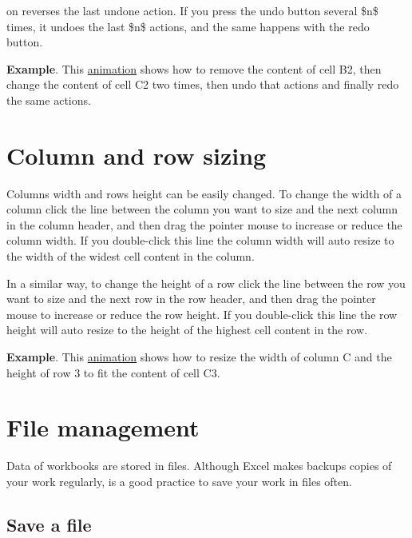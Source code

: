on reverses the last undone action. If you press the undo button several \$n\$ times, it undoes the last \$n\$ actions, and the same happens with the redo button.

\textbf{Example}.  This \href{http://aprendeconalf.es/office/excel/manual/img/example_undo.gif}{animation} shows how to remove the content of cell B2, then change the content of cell C2 two times, then undo that actions and finally redo the same actions.

\section{Column and row sizing}\hypertarget{column-and-row-sizing}{}\label{column-and-row-sizing}

Columns width and rows height can be easily changed. To change the width of a column click the line between the column you want to size and the next column in the column header, and then drag the pointer mouse to increase or reduce the column width. If you double-click this line the column width will auto resize to the width of the widest cell content in the column.

In a similar way, to change the height of a row click the line between the row you want to size and the next row in the row header, and then drag the pointer mouse to increase or reduce the row height. If you double-click this line the row height will auto resize to the height of the highest cell content in the row.

\textbf{Example}.  This \href{http://aprendeconalf.es/office/excel/manual/img/example_row_column_resize.gif}{animation} shows how to resize the width of column C and the height of row 3 to fit the content of cell C3.


\section{File management}\hypertarget{file-management}{}\label{file-management}

Data of workbooks are stored in files. Although Excel makes backups copies of your work regularly, is a good practice to save your work in files often.

\subsection{Save a file}\hypertarget{save-a-file}{}\label{save-a-file}

